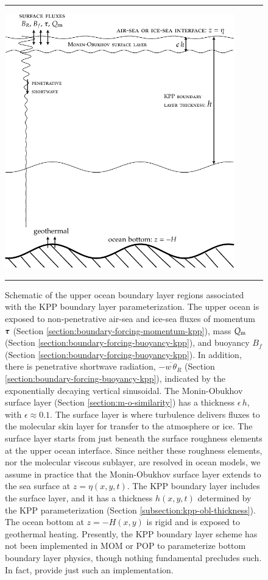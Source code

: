 \begin{figure}[h!t]
\rule{\textwidth}{0.005in}
\begin{center}
\includegraphics[angle=0,width=10cm]{./mfpic_figs/cvmix_kpp_boundary_layer.pdf}
\caption[KPP boundary layer schematic]{\sf Schematic of the upper
  ocean boundary layer regions associated with the KPP boundary layer
  parameterization.  The upper ocean is exposed to non-penetrative
  air-sea and ice-sea fluxes of momentum $\mbox{\boldmath $\tau$}$ (Section
  \ref{section:boundary-forcing-momentum-kpp}), mass $Q_{\mbox{\scriptsize m}}$(Section
  \ref{section:boundary-forcing-buoyancy-kpp}), and buoyancy $B_{f}$
  (Section \ref{section:boundary-forcing-buoyancy-kpp}).  In addition,
  there is penetrative shortwave radiation, $-\overline{w \,
    \theta}_{R}$ (Section
  \ref{section:boundary-forcing-buoyancy-kpp}), indicated by the
  exponentially decaying vertical sinusoidal.  The Monin-Obukhov
  surface layer (Section \ref{section:m-o-similarity}) has a thickness
  $\epsilon \, h$, with $\epsilon \approx 0.1$.  The surface layer is
  where turbulence delivers fluxes to the molecular skin layer for
  transfer to the atmosphere or ice.  The surface layer starts from
  just beneath the surface roughness elements at the upper ocean
  interface.  Since neither these roughness elements, nor the
  molecular viscous sublayer, are resolved in ocean models, we assume
  in practice that the Monin-Obukhov surface layer extends to the sea
  surface at $z=\eta(x,y,t)$.  The KPP boundary layer includes the
  surface layer, and it has a thickness $h(x,y,t)$ determined by the
  KPP parameterization (Section \ref{subsection:kpp-obl-thickness}).
  The ocean bottom at $z=-H(x,y)$ is rigid and is exposed to
  geothermal heating.  Presently, the KPP boundary layer scheme has
  not been implemented in MOM or POP to parameterize bottom boundary
  layer physics, though nothing fundamental precludes such.  In fact,
  \cite{Durski_etal2004} provide just such an implementation.}
\label{fig:boundary-layer-schematic-kpp}
\end{center}
\rule{\textwidth}{0.005in}
\end{figure}


